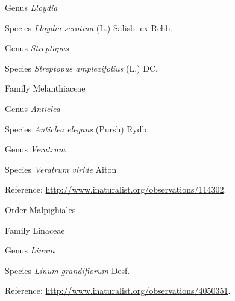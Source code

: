 \documentclass[9pt, article]{memoir}
\begin{document}
\begin{multicols}{2}
\vspace{6pt}\noindent\hspace{30pt}Genus \textit{Lloydia}


\vspace{6pt}\noindent\hspace{36pt}Species \textit{Lloydia serotina} (L.) Salisb. ex Rchb.


\vspace{6pt}\noindent\hspace{30pt}Genus \textit{Streptopus}


\vspace{6pt}\noindent\hspace{36pt}Species \textit{Streptopus amplexifolius} (L.) DC.


\vspace{6pt}\noindent\hspace{24pt}Family Melanthiaceae


\vspace{6pt}\noindent\hspace{30pt}Genus \textit{Anticlea}


\vspace{6pt}\noindent\hspace{36pt}Species \textit{Anticlea elegans} (Pursh) Rydb.


\vspace{6pt}\noindent\hspace{30pt}Genus \textit{Veratrum}


\vspace{6pt}\noindent\hspace{36pt}Species \textit{Veratrum viride} Aiton


\vspace{6pt}Reference: 
\url{http://www.inaturalist.org/observations/114302}.

\vspace{6pt}\noindent\hspace{18pt}Order Malpighiales


\vspace{6pt}\noindent\hspace{24pt}Family Linaceae


\vspace{6pt}\noindent\hspace{30pt}Genus \textit{Linum}


\vspace{6pt}\noindent\hspace{36pt}Species \textit{Linum grandiflorum} Desf.


\vspace{6pt}Reference: 
\url{http://www.inaturalist.org/observations/4050351}.


\end{multicols}
\end{document}
